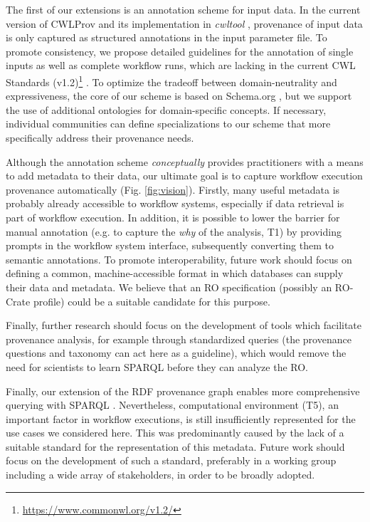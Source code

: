 The first of our extensions is an annotation scheme for input data. In the current version of CWLProv and its implementation in \emph{cwltool} \cite{crusoeCommonworkflowlanguageCwltool202305131557342023}, provenance of input data is only captured as structured annotations in the input parameter file. To promote consistency, we propose detailed guidelines for the annotation of single inputs as well as complete workflow runs, which are lacking in the current CWL Standards (v1.2)\footnote{\url{https://www.commonwl.org/v1.2/}} \cite{crusoeMethodsIncludedStandardizing2022}  . To optimize the tradeoff between domain-neutrality and expressiveness, the core of our scheme is based on Schema.org \cite{guhaBigDataMakes2015}, but we support the use of additional ontologies for domain-specific concepts. If necessary, individual communities can define specializations to our scheme that more specifically address their provenance needs.

Although the annotation scheme \emph{conceptually} provides practitioners with a means to add metadata to their data, our ultimate goal is to capture workflow execution provenance automatically (Fig. \ref{fig:vision}). Firstly, many useful metadata is probably already accessible to workflow systems, especially if data retrieval is part of workflow execution. In addition, it is possible to lower the barrier for manual annotation (e.g. to capture the \emph{why} of the analysis, T1) by providing prompts in the workflow system interface, subsequently converting them to semantic annotations. To promote interoperability, future work should focus on defining a common, machine-accessible format in which databases can supply their data and metadata. We believe that an RO specification (possibly an RO-Crate profile) could be a suitable candidate for this purpose. 

Finally, further research should focus on the development of tools which facilitate provenance analysis, for example through standardized queries (the provenance questions and taxonomy can act here as a guideline), which would remove the need for scientists to learn SPARQL before they can analyze the RO. 

Finally, our extension of the RDF provenance graph enables more comprehensive querying with SPARQL \cite{thew3csparqlworkinggroupSPARQLOverview2013}. Nevertheless, computational environment (T5), an important factor in workflow executions, is still insufficiently represented for the use cases we considered here. This was predominantly caused by the lack of a suitable standard for the representation of this metadata. Future work should focus on the development of such a standard, preferably in a working group including a wide array of stakeholders, in order to be broadly adopted. 

